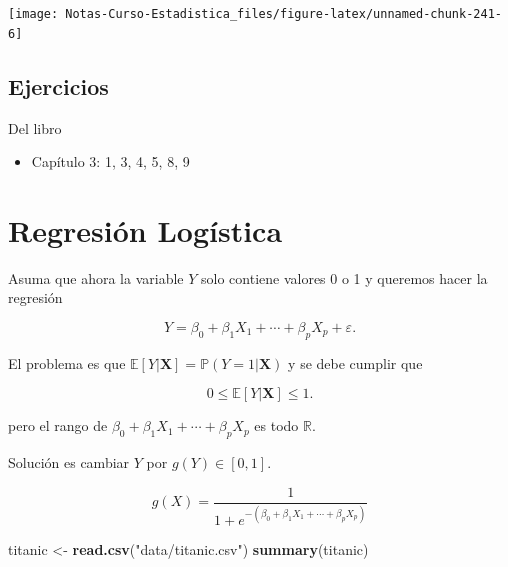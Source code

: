 \documentclass[
  12pt,
]{book}
\newenvironment{Shaded}{\begin{snugshade}}{\end{snugshade}}
\newcommand{\KeywordTok}[1]{\textcolor[rgb]{0.13,0.29,0.53}{\textbf{#1}}}
\newcommand{\NormalTok}[1]{#1}
\newcommand{\StringTok}[1]{\textcolor[rgb]{0.31,0.60,0.02}{#1}}
\providecommand{\tightlist}{%
  \setlength{\itemsep}{0pt}\setlength{\parskip}{0pt}}
\theoremstyle{definition}
\theoremstyle{definition}
\theoremstyle{definition}
\theoremstyle{remark}
\begin{document}
\begin{center}\texttt{[image: Notas-Curso-Estadistica\_files/figure-latex/unnamed-chunk-241-6]} \end{center}

\hypertarget{ejercicios-3}{%
\section{Ejercicios}\label{ejercicios-3}}

Del libro \autocite{James2013b}

\begin{itemize}
\tightlist
\item
  Capítulo 3: 1, 3, 4, 5, 8, 9
\end{itemize}

\hypertarget{regresiuxf3n-loguxedstica}{%
\chapter{Regresión Logística}\label{regresiuxf3n-loguxedstica}}

Asuma que ahora la variable \(Y\) solo contiene valores 0 o 1 y queremos hacer la regresión

\begin{equation*}
Y = \beta_{0} +\beta_{1} X_{1} + \cdots + \beta_{p} X_{p} + \varepsilon.
\end{equation*}

El problema es que \(\mathbb{E}\left[Y | \boldsymbol{X}\right] = \mathbb{P}\left(Y=1\vert \boldsymbol{X}\right)\) y se debe cumplir que

\begin{equation*}
0\leq \mathbb{E}\left[Y | \boldsymbol{X}\right]\leq 1.
\end{equation*}

pero el rango de \(\beta_{0} +\beta_{1} X_{1} + \cdots + \beta_{p} X_{p}\) es todo \(\mathbb{R}\).

Solución es cambiar \(Y\) por \(g(Y)\in [0,1]\).

\begin{equation*}
g(X) = \frac{1}{1+e^{-(\beta_{0} +\beta_{1} X_{1} + \cdots + \beta_{p} X_{p})}}
\end{equation*}

\begin{Shaded}
\begin{Highlighting}[]
\NormalTok{titanic <-}\StringTok{ }\KeywordTok{read.csv}\NormalTok{(}\StringTok{"data/titanic.csv"}\NormalTok{)}
\KeywordTok{summary}\NormalTok{(titanic)}
\end{Highlighting}
\end{Shaded}
\end{document}
